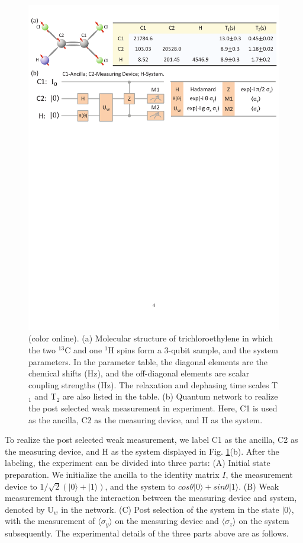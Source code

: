 \documentclass[prl,twocolumn,showpacs]{revtex4}
\begin{document}
\begin{figure}[h] \centering
\includegraphics[width=\columnwidth]{molecule.pdf}
\caption{(color online). (a) Molecular structure of trichloroethylene in which the two $^{13}$C and one $^{1}$H spins form a 3-qubit sample, and the system parameters. In the parameter table, the diagonal elements are the chemical shifts (Hz), and the off-diagonal elements are scalar coupling strengths (Hz). The relaxation and dephasing time scales T$_1$ and T$_2$ are also listed in the table. (b) Quantum network to realize the post selected weak measurement in experiment. Here, C1 is used as the ancilla, C2 as the measuring device, and H as the system. }\label{molecule}
\end{figure}

 To realize the post selected weak measurement, we label C1 as the ancilla, C2 as the measuring device, and H as the system displayed in Fig. \ref{molecule}(b). After the labeling, the experiment can be divided into three parts: (A) Initial state preparation. We initialize the ancilla to the identity matrix $I$, the measurement device to $1/\sqrt{2}(|0\rangle+|1\rangle) $, and the system to $cos\theta|0\rangle+sin\theta|1\rangle$. (B) Weak measurement through the interaction between the measuring device and system, denoted by U$_w$ in the network. (C) Post selection of the system in the state $|0\rangle$, with the measurement of $\langle \sigma_y \rangle$ on the measuring device and $\langle \sigma_z \rangle$ on the system subsequently. The experimental details of the three parts above are as follows.
\end{document}
